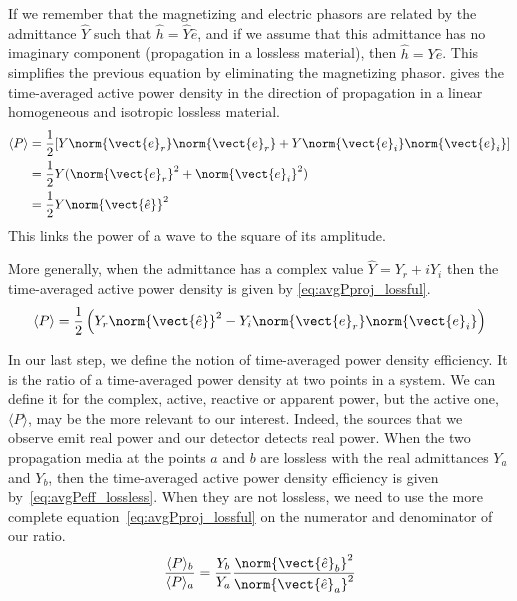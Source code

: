 If we remember that the magnetizing and electric phasors are related by the admittance $\hat{Y}$ such that $\hat{h} = \hat{Y} \hat{e}$, and if we assume that this admittance has no imaginary component (propagation in a lossless material), then $\hat{h} = Y \hat{e}$.
This simplifies the previous equation by eliminating the magnetizing phasor.
 gives the time-averaged active power density in the direction of propagation in a linear homogeneous and isotropic lossless material.
\begin{subequations}
    \begin{align}
        \langle P \rangle
        &=
        \frac{1}{2}
        [
            Y \norm{\vect{e}_r} \norm{\vect{e}_r}
            +
            Y \norm{\vect{e}_i} \norm{\vect{e}_i}
        ]
        \\
        &=
        \frac{1}{2} Y
        (\norm{\vect{e}_r}^2 + \norm{\vect{e}_i}^2)
        \\
        &=
        \frac{1}{2} Y
        \norm{\vect{\hat{e}}}^2
    \end{align}
    \label{eq:avgPproj_lossless}
\end{subequations}
This links the power of a wave to the square of its amplitude.

More generally, when the admittance has a complex value $\hat{Y} = Y_r + i Y_i$ then the time-averaged active power density is given by \cref{eq:avgPproj_lossful}.
\begin{equation}    
    \langle P \rangle
    =
    \frac{1}{2}
    \left(
        Y_r \norm{\vect{\hat{e}}}^2
        -
        Y_i \norm{\vect{e}_r} \norm{\vect{e}_i}
    \right)
\label{eq:avgPproj_lossful}
\end{equation}

In our last step, we define the notion of time-averaged power density efficiency.
It is the ratio of a time-averaged power density at two points in a system.
We can define it for the complex, active, reactive or apparent power, but the active one, $\langle P \rangle$, may be the more relevant to our interest.
Indeed, the sources that we observe emit real power and our detector detects real power.
When the two propagation media at the points $a$ and $b$ are lossless with the real admittances $Y_a$ and $Y_b$, then the time-averaged active power density efficiency is given by~\cref{eq:avgPeff_lossless}.
When they are not lossless, we need to use the more complete equation~\eqref{eq:avgPproj_lossful} on the numerator and denominator of our ratio.
\begin{equation}
    \frac{\langle P \rangle_b}{\langle P \rangle_a}
    =
    \frac{Y_b}{Y_a}
    \frac{\norm{\vect{\hat{e}}_b}^2}{\norm{\vect{\hat{e}}_a}^2}
    \label{eq:avgPeff_lossless}
\end{equation}

